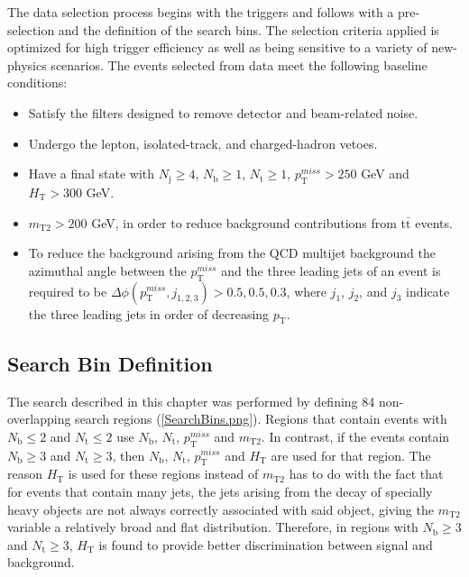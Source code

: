 The data selection process begins with the triggers and follows with a pre-selection and the definition of the search bins. The selection criteria applied is optimized for high trigger efficiency as well as being sensitive to a variety of new-physics scenarios. The events selected from data meet the following baseline conditions:\\
 
\begin{itemize}
	\item{Satisfy the filters designed to remove detector and beam-related noise.}
	\item{Undergo the lepton, isolated-track, and charged-hadron vetoes.}
	\item{Have a final state with $N_\text{j} \geq 4$, $N_\text{b} \geq 1$, $N_\text{t} \geq 1$, $p_{\text{T}}^{miss} > 250$ GeV and $H_\text{T} > 300$ GeV.}
	\item{$m_\text{T2} > 200$ GeV, in order to reduce background contributions from t$\bar{\text{t}}$ events.}
	\item{To reduce the background arising from the QCD multijet background the azimuthal angle between the $p_{\text{T}}^{miss}$ and the three leading jets of an event is required to be $\Delta\phi(p_{\text{T}}^{miss},j_{1,2,3}) > 0.5, 0.5, 0.3$, where $j_1$, $j_2$, and $j_3$ indicate the three leading jets in order of decreasing $p_\text{T}$.}
\end{itemize}

\subsection{Search Bin Definition}

The search described in this chapter was performed by defining 84 non-overlapping search regions (\autoref{SearchBins.png}). Regions that contain events with $N_\text{b} \leq 2$ and $N_\text{t} \leq 2$ use  $N_\text{b}$, $N_\text{t}$, $p_{\text{T}}^{miss}$ and $m_\text{T2}$. In contrast, if the events contain $N_\text{b} \geq 3$ and $N_\text{t} \geq 3$, then $N_\text{b}$, $N_\text{t}$, $p_{\text{T}}^{miss}$ and $H_\text{T}$ are used for that region. The reason $H_\text{T}$ is used for these regions instead of $m_\text{T2}$ has to do with the fact that for events that contain many jets, the jets arising from the decay of specially heavy objects are not always correctly associated with said object, giving the $m_\text{T2}$ variable a relatively broad and flat distribution. Therefore, in regions with $N_\text{b} \geq 3$ and $N_\text{t} \geq 3$, $H_\text{T}$ is found to provide better discrimination between signal and background.


